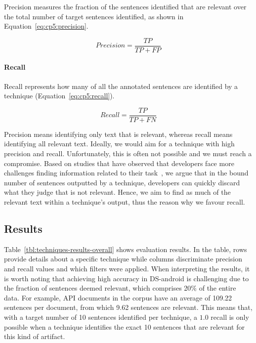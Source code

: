Precision measures the fraction of the sentences identified that are relevant over the total number of target sentences identified, as shown in Equation~\ref{eq:cp5:precision}.



\begin{equation}
\label{eq:cp5:precision}    
    Precision = \frac{TP}{TP + FP}
\end{equation}



\paragraph{\textbf{Recall}} Recall represents how many of all the annotated sentences are identified by a technique (Equation~\ref{eq:cp5:recall}).


\begin{equation}
\label{eq:cp5:recall}        
    Recall = \frac{TP}{TP + FN}
\end{equation}



\medskip
Precision means identifying only text that is relevant, whereas recall means identifying all relevant text.
Ideally, we would aim for a technique with high precision and recall. Unfortunately, this is often not possible and we must reach a compromise.
Based on studies that have observed that developers face more challenges finding information related to their task~\cite{Robillard2015, Maalej2013}, we argue that in the bound number of sentences outputted by a technique, developers can quickly discard what they judge that is not relevant.  Hence, we aim to find as much of the relevant text within a technique's output, thus the reason why we favour recall.







\subsection{Results}


Table~\ref{tbl:techniques-results-overall} shows evaluation results. 
In the table, rows provide details about a specific technique while columns discriminate 
precision and recall values and which filters were applied. 
When interpreting the results, it is worth noting that achieving high accuracy in \acs{DS-android} is challenging
due to the fraction of sentences deemed relevant, which comprises 20\% of the entire data.
For example, API documents in the corpus have an average of 109.22 sentences per document, from which 9.62 sentences are relevant. 
This means that, with a target number of 10 sentences identified per technique, a $1.0$ recall is only possible when a technique identifies the exact 10 sentences that are relevant for this kind of artifact.



